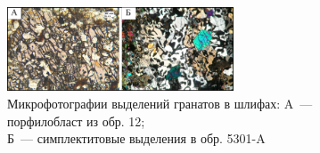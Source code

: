 \begin{figure}[H]
  \begin{center}
    \includegraphics[width=0.6\textwidth]{authors/polzunenkov-fig1.png}
  \end{center}
  \caption {Микрофотографии выделений гранатов в шлифах: A~--- порфилобласт из обр. 12; \\Б~--- симплектитовые выделения в обр. 5301-A
}

\end{figure}

